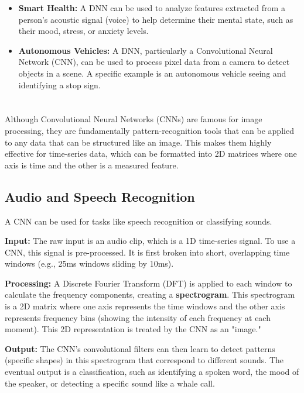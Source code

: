 \documentclass[a4paper,12pt]{article}
\begin{document}
\begin{itemize}
    \item \textbf{Smart Health:} A DNN can be used to analyze features extracted from a person's acoustic signal (voice) to help determine their mental state, such as their mood, stress, or anxiety levels.
    \item \textbf{Autonomous Vehicles:} A DNN, particularly a Convolutional Neural Network (CNN), can be used to process pixel data from a camera to detect objects in a scene. A specific example is an autonomous vehicle seeing and identifying a stop sign.
\end{itemize}

\section{}

Although Convolutional Neural Networks (CNNs) are famous for image processing, they are fundamentally pattern-recognition tools that can be applied to any data that can be structured like an image. This makes them highly effective for time-series data, which can be formatted into 2D matrices where one axis is time and the other is a measured feature.

\subsection{Audio and Speech Recognition}
A CNN can be used for tasks like speech recognition or classifying sounds.

\textbf{Input:} The raw input is an audio clip, which is a 1D time-series signal. To use a CNN, this signal is pre-processed. It is first broken into short, overlapping time windows (e.g., 25ms windows sliding by 10ms).

\textbf{Processing:} A Discrete Fourier Transform (DFT) is applied to each window to calculate the frequency components, creating a \textbf{spectrogram}. This spectrogram is a 2D matrix where one axis represents the time windows and the other axis represents frequency bins (showing the intensity of each frequency at each moment). This 2D representation is treated by the CNN as an "image."

\textbf{Output:} The CNN's convolutional filters can then learn to detect patterns (specific shapes) in this spectrogram that correspond to different sounds. The eventual output is a classification, such as identifying a spoken word, the mood of the speaker, or detecting a specific sound like a whale call.
\end{document}

